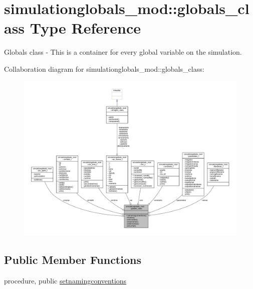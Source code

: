 \hypertarget{structsimulationglobals__mod_1_1globals__class}{}\section{simulationglobals\+\_\+mod\+:\+:globals\+\_\+class Type Reference}
\label{structsimulationglobals__mod_1_1globals__class}


Globals class -\/ This is a container for every global variable on the simulation.  




Collaboration diagram for simulationglobals\+\_\+mod\+:\+:globals\+\_\+class\+:\nopagebreak
\begin{figure}[H]
\begin{center}
\leavevmode
\includegraphics[width=350pt]{structsimulationglobals__mod_1_1globals__class__coll__graph}
\end{center}
\end{figure}
\subsection*{Public Member Functions}
\begin{DoxyCompactItemize}
\item 
procedure, public \mbox{\hyperlink{structsimulationglobals__mod_1_1globals__class_a3b33541d0f9a90c78d500b55ef452ee0}{setnamingconventions}}
\end{DoxyCompactItemize}
